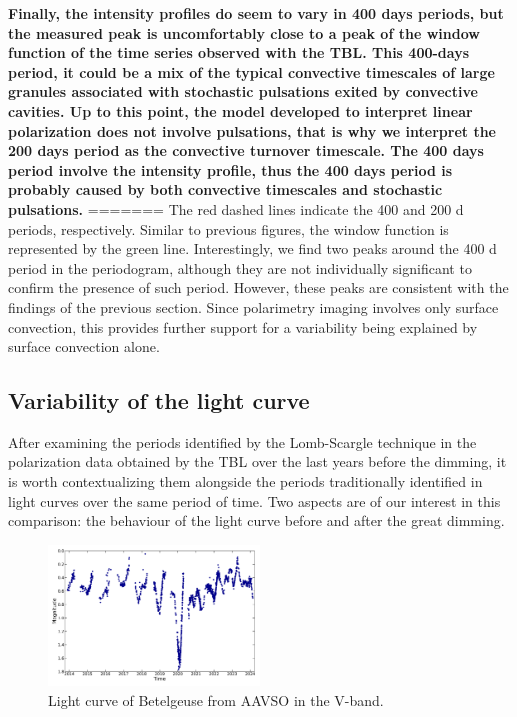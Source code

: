 \documentclass{aa}
\begin{document}
\textbf{Finally, the intensity profiles do  seem to vary in  400 days periods, but the measured peak is uncomfortably close to a 
peak of the window function of the time series observed with the TBL. This 400-days period, it could be a mix of the typical convective 
timescales of large granules associated with stochastic pulsations exited by convective cavities. Up to this point, the model developed to 
interpret linear polarization does not involve pulsations, that is why we interpret the 200 days period as the convective turnover timescale. 
The 400 days period involve the intensity profile, thus the 400 days period is probably caused by both convective timescales and stochastic 
pulsations.}
=======
The red dashed lines indicate the 400 and 
200 d periods, respectively. Similar to previous figures, the window function is represented by the green line. Interestingly, we find two peaks around the 400 d period in the periodogram, although they are not individually significant to confirm the presence of such period. However, these peaks are consistent with the findings of the previous section. Since polarimetry imaging involves only surface convection, this provides further support for a variability being explained by surface convection alone.


\subsection{Variability of the light curve}

After examining the periods identified by the Lomb-Scargle technique in the polarization data obtained by the TBL over the last years before the dimming, it is worth contextualizing them alongside the periods traditionally identified in light curves over the same period of time. Two aspects 
are of our interest in this comparison: the behaviour of the light curve before and after the great dimming.

\begin{figure}[!h]
    \centering
    \includegraphics[width=0.5\textwidth]{Light_curve_Betelgeuse.pdf}
    \caption{Light curve of Betelgeuse from AAVSO in the V-band.}
    \label{light curve Betelgeuse}
\end{figure}
\end{document}
